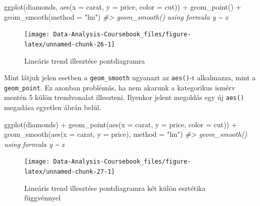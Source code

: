 \documentclass[
]{article}
\newenvironment{Shaded}{\begin{snugshade}}{\end{snugshade}}
\newcommand{\AttributeTok}[1]{\textcolor[rgb]{0.77,0.63,0.00}{#1}}
\newcommand{\CommentTok}[1]{\textcolor[rgb]{0.56,0.35,0.01}{\textit{#1}}}
\newcommand{\FunctionTok}[1]{\textcolor[rgb]{0.00,0.00,0.00}{#1}}
\newcommand{\NormalTok}[1]{#1}
\newcommand{\SpecialCharTok}[1]{\textcolor[rgb]{0.00,0.00,0.00}{#1}}
\newcommand{\StringTok}[1]{\textcolor[rgb]{0.31,0.60,0.02}{#1}}
\begin{document}
\begin{Shaded}
\begin{Highlighting}[]
\FunctionTok{ggplot}\NormalTok{(diamonds, }\FunctionTok{aes}\NormalTok{(}\AttributeTok{x =}\NormalTok{ carat, }\AttributeTok{y =}\NormalTok{ price, }\AttributeTok{color =}\NormalTok{ cut)) }\SpecialCharTok{+}
  \FunctionTok{geom\_point}\NormalTok{() }\SpecialCharTok{+} 
  \FunctionTok{geom\_smooth}\NormalTok{(}\AttributeTok{method =} \StringTok{"lm"}\NormalTok{)}
\CommentTok{\#\textgreater{} \textasciigrave{}geom\_smooth()\textasciigrave{} using formula \textquotesingle{}y \textasciitilde{} x\textquotesingle{}}
\end{Highlighting}
\end{Shaded}

\begin{figure}

{\centering \texttt{[image: Data-Analysis-Coursebook\_files/figure-latex/unnamed-chunk-26-1]} 

}

\caption{Lineáris trend illesztése pontdiagramra}\label{fig:unnamed-chunk-26}
\end{figure}

Mint látjuk jelen esetben a \texttt{geom\_smooth} ugyanazt az \texttt{aes()}-t alkalmazza, mint a \texttt{geom\_point}. Ez azonban problémás, ha nem akarunk a kategorikus ismérv mentén 5 külön trendvonalat illeszteni. Ilyenkor jelent megoldás egy új \texttt{aes()} megadása egyetlen ábrán belül.

\begin{Shaded}
\begin{Highlighting}[]
\FunctionTok{ggplot}\NormalTok{(diamonds) }\SpecialCharTok{+}
  \FunctionTok{geom\_point}\NormalTok{(}\FunctionTok{aes}\NormalTok{(}\AttributeTok{x =}\NormalTok{ carat, }\AttributeTok{y =}\NormalTok{ price, }\AttributeTok{color =}\NormalTok{ cut)) }\SpecialCharTok{+} 
  \FunctionTok{geom\_smooth}\NormalTok{(}\FunctionTok{aes}\NormalTok{(}\AttributeTok{x =}\NormalTok{ carat, }\AttributeTok{y =}\NormalTok{ price), }\AttributeTok{method =} \StringTok{"lm"}\NormalTok{)}
\CommentTok{\#\textgreater{} \textasciigrave{}geom\_smooth()\textasciigrave{} using formula \textquotesingle{}y \textasciitilde{} x\textquotesingle{}}
\end{Highlighting}
\end{Shaded}

\begin{figure}

{\centering \texttt{[image: Data-Analysis-Coursebook\_files/figure-latex/unnamed-chunk-27-1]} 

}

\caption{Lineáris trend illesztése pontdiagramra két külön esztétika függvénnyel}\label{fig:unnamed-chunk-27}
\end{figure}
\end{document}

